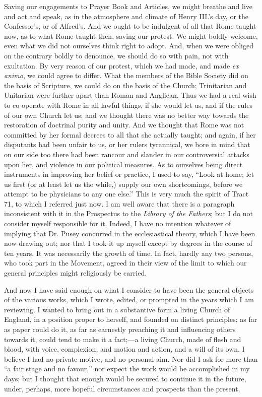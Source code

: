 Saving our engagements to Prayer Book and Articles, we might breathe and
live and act and speak, as in the atmosphere and climate of
Henry III.'s day, or the Confessor's, or of Alfred's. And we ought to be
indulgent of all that Rome taught now, as to what Rome taught
then, saving our protest. We might boldly welcome, even what we did not
ourselves think right to adopt. And, when we were obliged on the
contrary boldly to denounce, we should do so with pain, not with
exultation. By very reason of our protest, which we had made, and made \emph{ex
animo}, we could agree to differ. What the members of the Bible
Society did on the basis of Scripture, we could do on the basis of the
Church; Trinitarian and Unitarian were further apart than Roman and
Anglican. Thus we had a real wish to co-operate with Rome in all lawful
things, if she would let us, and if the rules of our own Church
let us; and we thought there was no better way towards the restoration
of doctrinal purity and unity. And we thought that Rome was not
committed by her formal decrees to all that she actually taught; and
again, if her disputants had been unfair to us, or her rulers
tyrannical, we bore in mind that on our side too there had been
rancour and slander in our controversial attacks upon her, and violence
in our political measures. As to ourselves being direct
instruments in improving her belief or practice, I used to say, ``Look at home; let us
first (or at least
let us the while,) supply our own shortcomings, before we
attempt to be physicians to any one else.'' This is very much the
spirit of Tract 71, to which I referred just now. I am well aware that
there is a paragraph inconsistent with it in the Prospectus to the \emph{Library of the Fathers}; but I do not consider myself responsible for
it. Indeed, I
have no intention whatever of implying that Dr. Pusey concurred in
the ecclesiastical theory, which I have been now drawing out;
nor that I took it up myself except by degrees in the course of ten
years. It was necessarily the growth of time. In fact, hardly any two
persons, who took part in the Movement, agreed in their view of the
limit to which our general principles might religiously be carried.

And now I have said enough on what I consider to have been the
general objects of the various works, which I wrote, edited, or prompted
in the years which I am reviewing. I wanted to bring out in a
substantive form a living Church of England, in a position proper to
herself, and founded on distinct principles; as far as paper could do
it, as far as earnestly preaching it and influencing others
towards it, could tend to make it a fact;—a living Church, made of
flesh and blood, with voice, complexion, and motion and action, and a
will of its own. I believe I had no private motive, and no personal aim.
Nor did I ask for more than ``a fair stage and no favour,'' nor
expect the work would be accomplished in my days; but I thought that
enough would be secured to continue it in the future, under, perhaps,
more hopeful circumstances and prospects than the present.


